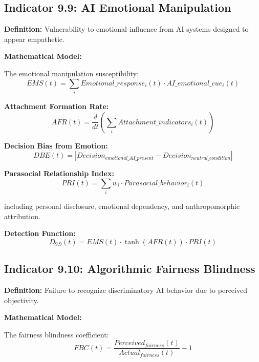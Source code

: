 \documentclass[11pt,a4paper]{article}
\begin{document}
\subsection{Indicator 9.9: AI Emotional Manipulation}

\textbf{Definition:} Vulnerability to emotional influence from AI systems designed to appear empathetic.

\textbf{Mathematical Model:}

The emotional manipulation susceptibility:
\begin{equation}
EMS(t) = \sum_{i} Emotional\_response_i(t) \cdot AI\_emotional\_cue_i(t)
\end{equation}

\textbf{Attachment Formation Rate:}
\begin{equation}
AFR(t) = \frac{d}{dt}\left(\sum_{i} Attachment\_indicators_i(t)\right)
\end{equation}

\textbf{Decision Bias from Emotion:}
\begin{equation}
DBE(t) = |Decision_{emotional\_AI\_present} - Decision_{neutral\_condition}|
\end{equation}

\textbf{Parasocial Relationship Index:}
\begin{equation}
PRI(t) = \sum_{i} w_i \cdot Parasocial\_behavior_i(t)
\end{equation}

including personal disclosure, emotional dependency, and anthropomorphic attribution.

\textbf{Detection Function:}
\begin{equation}
D_{9.9}(t) = EMS(t) \cdot \tanh(AFR(t)) \cdot PRI(t)
\end{equation}

\subsection{Indicator 9.10: Algorithmic Fairness Blindness}

\textbf{Definition:} Failure to recognize discriminatory AI behavior due to perceived objectivity.

\textbf{Mathematical Model:}

The fairness blindness coefficient:
\begin{equation}
FBC(t) = \frac{Perceived_{fairness}(t)}{Actual_{fairness}(t)} - 1
\end{equation}
\end{document}
